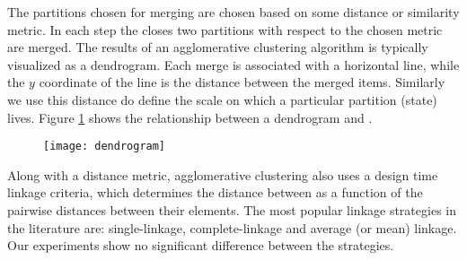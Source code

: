 The partitions chosen for merging are chosen based on some distance or similarity metric. In each step
the closes two partitions with respect to the chosen metric are merged. The results of an agglomerative clustering
algorithm is typically visualized as a dendrogram. Each merge is associated with a horizontal line, while
the $y$ coordinate of the line is the distance between the merged items. Similarly
we use this distance do define the scale on which a particular partition (state) lives. Figure \ref{fig:dendrogram} shows
the relationship between a dendrogram and .

\begin{figure}[h!]
	\centering
	\texttt{[image: dendrogram]}
	\caption{}
	\label{fig:dendrogram}
\end{figure}

Along with a distance metric, agglomerative clustering also uses a design time linkage criteria, which determines
the distance between  as a function of the pairwise distances between their elements. The most popular
linkage strategies in the literature are: single-linkage, complete-linkage and average (or mean) linkage. Our
experiments show no significant difference between the strategies.
